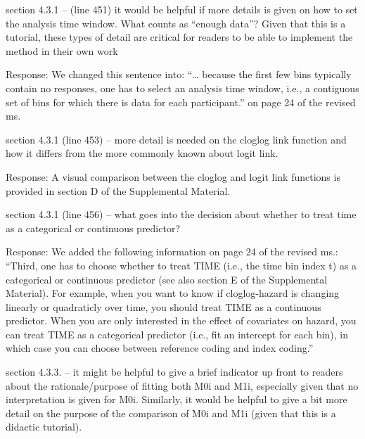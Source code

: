 \documentclass[
]{article}
\renewenvironment{quote}{\begin{leftbar}}{\end{leftbar}}
\begin{document}
\begin{quote}
section 4.3.1 -- (line 451) it would be helpful if more details is given
on how to set the analysis time window. What counts as ``enough data''?
Given that this is a tutorial, these types of detail are critical for
readers to be able to implement the method in their own work
\end{quote}

Response: We changed this sentence into: ``\ldots{} because the first
few bins typically contain no responses, one has to select an analysis
time window, i.e., a contiguous set of bins for which there is data for
each participant.'' on page 24 of the revised ms.

\begin{quote}
section 4.3.1 (line 453) -- more detail is needed on the cloglog link
function and how it differs from the more commonly known about logit
link.
\end{quote}

Response: A visual comparison between the cloglog and logit link
functions is provided in section D of the Supplemental Material.

\begin{quote}
section 4.3.1 (line 456) -- what goes into the decision about whether to
treat time as a categorical or continuous predictor?
\end{quote}

Response: We added the following information on page 24 of the revised
ms.: ``Third, one has to choose whether to treat TIME (i.e., the time
bin index t) as a categorical or continuous predictor (see also section
E of the Supplemental Material). For example, when you want to know if
cloglog-hazard is changing linearly or quadraticly over time, you should
treat TIME as a continuous predictor. When you are only interested in
the effect of covariates on hazard, you can treat TIME as a categorical
predictor (i.e., fit an intercept for each bin), in which case you can
choose between reference coding and index coding.''

\begin{quote}
section 4.3.3. -- it might be helpful to give a brief indicator up front
to readers about the rationale/purpose of fitting both M0i and M1i,
especially given that no interpretation is given for M0i. Similarly, it
would be helpful to give a bit more detail on the purpose of the
comparison of M0i and M1i (given that this is a didactic tutorial).
\end{quote}
\end{document}

